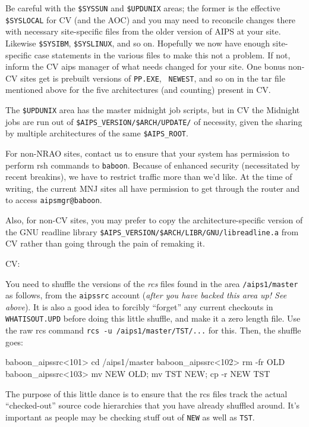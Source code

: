 Be careful with the {\tt \$SYSSUN} and {\tt\$UPDUNIX} areas; the former
is the effective {\tt\$SYSLOCAL} for CV (and the AOC) and you may need
to reconcile changes there with necessary site-specific files from the
older version of AIPS at your site.  Likewise {\tt\$SYSIBM},
{\tt\$SYSLINUX}, and so on.  Hopefully we now have enough site-specific
case statements in the various files to make this not a problem.  If
not, inform the CV aips manager of what needs changed for your site.
One bonus non-CV sites get is prebuilt versions of {\tt PP.EXE}, {\tt
NEWEST}, and so on in the tar file mentioned above for the five
architectures (and counting) present in CV.

The {\tt\$UPDUNIX} area has the master midnight job scripts, but in CV
the Midnight jobs are run out of {\tt\$AIPS\_VERSION/\$ARCH/UPDATE/} of
necessity, given the sharing by multiple architectures of the same
{\tt\$AIPS\_ROOT}.

For non-NRAO sites, contact us to ensure that your system has permission
to perform rsh commands to {\tt baboon}.  Because of enhanced security
(necessitated by recent breakins), we have to restrict traffic more than
we'd like.  At the time of writing, the current MNJ sites all have
permission to get through the router and to access {\tt aipsmgr@baboon}.

Also, for non-CV sites, you may prefer to copy the architecture-specific
version of the GNU readline library
{\tt\$AIPS\_VERSION/\$ARCH/LIBR/GNU/libreadline.a} from CV rather than
going through the pain of remaking it.

\item{CV:} {You need to shuffle the versions of the {\it rcs\/} files
	    found in the area {\tt /aips1/master} as follows, from the
	    {\tt aipssrc} account ({\it after you have backed this area
	    up!  See above\/}).  It is also a good idea to forcibly
	    ``forget'' any current checkouts in {\tt WHATISOUT.UPD}
	    before doing this little shuffle, and make it a zero length
	    file.  Use the raw rcs command {\tt rcs -u
	    /aips1/master/TST/...} for this.  Then, the shuffle goes:
	    \medskip

\fortran
baboon_aipssrc<101> cd /aips1/master
baboon_aipssrc<102> rm -fr OLD
baboon_aipssrc<103> mv NEW OLD; mv TST NEW; cp -r NEW TST
\endfortran
	    \medskip
}

\item{} The purpose of this little dance is to ensure that the rcs files
        track the actual ``checked-out'' source code hierarchies that
        you have already shuffled around.  It's important as people may
        be checking stuff out of {\tt NEW} as well as {\tt TST}.

